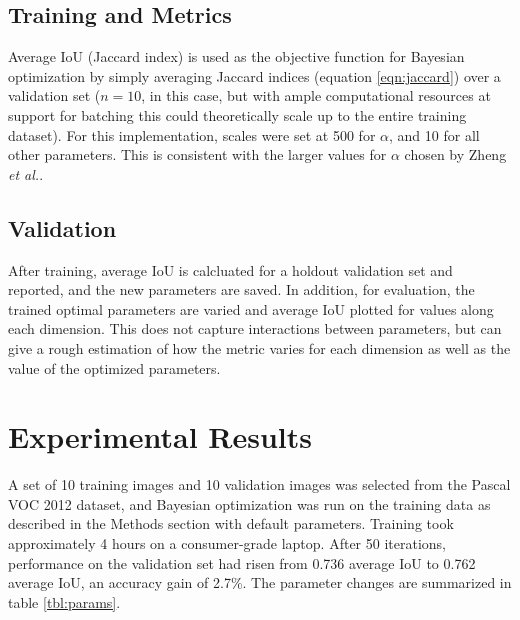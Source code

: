 \documentclass[10pt,twocolumn,letterpaper]{article}
\begin{document}
\subsection{Training and Metrics}
Average IoU (Jaccard index) is used as the objective function for Bayesian optimization by simply averaging Jaccard indices (equation \ref{eqn:jaccard}) over a validation set ($n = 10$, in this case, but with ample computational resources at support for batching this could theoretically scale up to the entire training dataset). 
For this implementation, scales were set at 500 for $\alpha$, and 10 for all other parameters. 
This is consistent with the larger values for $\alpha$ chosen by Zheng \textit{et al.}.

\subsection{Validation}
After training, average IoU is calcluated for a holdout validation set and reported, and the new parameters are saved. In addition, for evaluation, the trained optimal parameters are varied and average IoU plotted for values along each dimension. This does not capture interactions between parameters, but can give a rough estimation of how the metric varies for each dimension as well as the value of the optimized parameters.

\section{Experimental Results}
A set of 10 training images and 10 validation images was selected from the Pascal VOC 2012 dataset, and Bayesian optimization was run on the training data as described in the Methods section with default parameters. Training took approximately 4 hours on a consumer-grade laptop.
After 50 iterations, performance on the validation set had risen from 0.736 average IoU to 0.762 average IoU, an accuracy gain of 2.7\%. The parameter changes are summarized in table \ref{tbl:params}.
\end{document}
